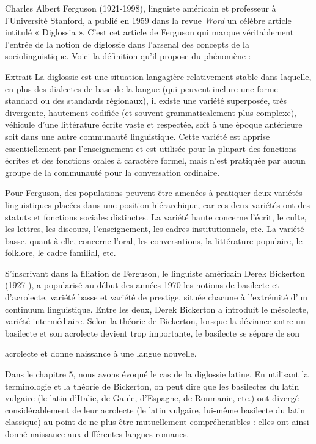 Charles Albert Ferguson (1921-1998), linguiste américain et professeur à l’Université Stanford, a publié en 1959 dans la revue \emph{Word} un célèbre article intitulé « Diglossia ». C’est cet article de Ferguson qui marque véritablement l’entrée de la notion de diglossie dans l’arsenal des concepts de la sociolinguistique. Voici la définition qu’il propose du phénomène :
\begin{lecture}{Extrait}
La diglossie est une situation langagière relativement stable dans laquelle, en plus des dialectes de base de la langue (qui peuvent inclure une forme standard ou des standards régionaux), il existe une variété superposée, très divergente, hautement codifiée (et souvent grammaticalement plus complexe), véhicule d’une littérature écrite vaste et respectée, soit à une époque antérieure soit dans une autre communauté linguistique. Cette variété est apprise essentiellement par l’enseignement et est utilisée pour la plupart des fonctions écrites et des fonctions orales à caractère formel, mais n’est pratiquée par aucun groupe de la communauté pour la conversation ordinaire.
\end{lecture}
Pour Ferguson, des populations peuvent être amenées à pratiquer deux variétés linguistiques placées dans une position hiérarchique, car ces deux variétés ont des statuts et fonctions sociales distinctes. La variété haute concerne l’écrit, le culte, les lettres, les discours, l’enseignement, les cadres institutionnels, etc. La variété basse, quant à elle, concerne l’oral, les conversations, la littérature populaire, le folklore, le cadre familial, etc.



S’inscrivant dans la filiation de Ferguson, le linguiste américain Derek Bickerton (1927-), a popularisé au début des années 1970 les notions de basilecte et d’acrolecte, variété basse et variété de prestige, située chacune à l’extrémité d’un continuum linguistique. Entre les deux, Derek Bickerton a introduit le mésolecte, variété intermédiaire. Selon la théorie de Bickerton, lorsque la déviance entre un basilecte et son acrolecte devient trop importante, le basilecte se sépare de son


acrolecte et donne naissance à une langue nouvelle.


Dans le chapitre 5, nous avons évoqué le cas de la diglossie latine. En utilisant la terminologie et la théorie de Bickerton, on peut dire que les basilectes du latin vulgaire (le latin d’Italie, de Gaule, d’Espagne, de Roumanie, etc.) ont divergé considérablement de leur acrolecte (le latin vulgaire, lui-même basilecte du latin classique) au point de ne plus être mutuellement compréhensibles : elles ont ainsi donné naissance aux différentes langues romanes.


